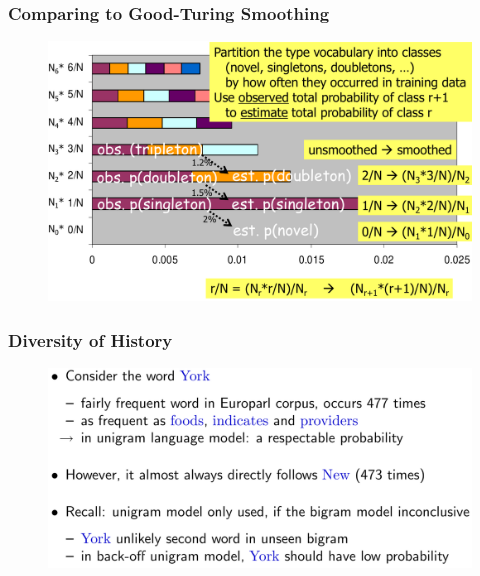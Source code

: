 \documentclass{beamer}
\begin{document}




\begin{frame}\frametitle{Comparing to Good-Turing Smoothing}
\begin{figure}
\includegraphics[width=0.9\linewidth]{figure/good_turing_witten_bell.pdf}
\end{figure}
\end{frame}






\begin{frame}\frametitle{Diversity of History}
\begin{figure}
\includegraphics[width=0.9\linewidth]{figure/diversity_history.pdf}
\end{figure}
\end{frame}
\end{document}
